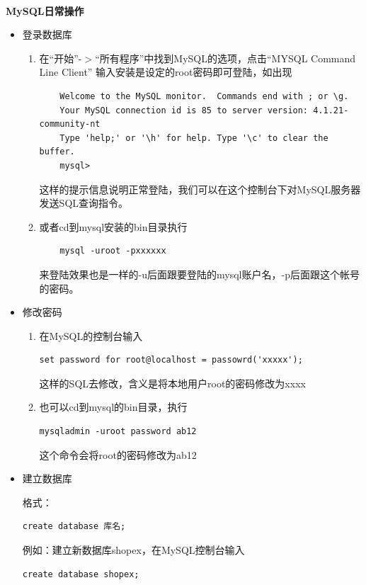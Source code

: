 \documentclass{article}
\begin{document}
\paragraph{}\textbf{MySQL日常操作}\\

\begin{itemize}
\item 登录数据库

    \begin{enumerate}
    \item 在“开始”-$>$“所有程序”中找到MySQL的选项，点击“MYSQL Command Line Client” 输入安装是设定的root密码即可登陆，如出现
\begin{verbatim}
    Welcome to the MySQL monitor.  Commands end with ; or \g.
    Your MySQL connection id is 85 to server version: 4.1.21-community-nt
    Type 'help;' or '\h' for help. Type '\c' to clear the buffer.
    mysql>
\end{verbatim}
    这样的提示信息说明正常登陆，我们可以在这个控制台下对MySQL服务器发送SQL查询指令。
    \item 或者cd到mysql安装的bin目录执行
\begin{verbatim}
    mysql -uroot -pxxxxxx
\end{verbatim}
    来登陆效果也是一样的-u后面跟要登陆的mysql账户名，-p后面跟这个帐号的密码。

    \end{enumerate}
\item 修改密码
    \begin{enumerate}
    \item 在MySQL的控制台输入
\begin{verbatim}
set password for root@localhost = passowrd('xxxxx');
\end{verbatim}
    这样的SQL去修改，含义是将本地用户root的密码修改为xxxx
    \item 也可以cd到mysql的bin目录，执行
\begin{verbatim}
mysqladmin -uroot password ab12
\end{verbatim}
    这个命令会将root的密码修改为ab12

    \end{enumerate}
\item 建立数据库

格式：
\begin{verbatim}
create database 库名;
\end{verbatim}
例如：建立新数据库shopex，在MySQL控制台输入　　
\begin{verbatim}
create database shopex;
\end{verbatim}


\end{itemize}
\end{document}
